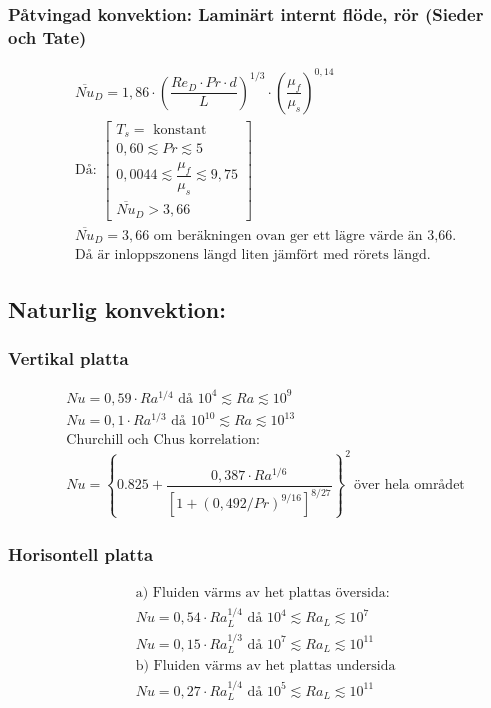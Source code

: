 	\subsubsection*{Påtvingad konvektion: Laminärt internt flöde, rör (Sieder och Tate)}
	\begin{align*}
		&\overline{Nu}_D = 1,86 \cdot \left( \dfrac{Re_D \cdot Pr \cdot d}{L} \right)^{1/3} \cdot \left( \dfrac{\mu_f}{\mu_s} \right)^{0,14} \\[8pt]
		&\text{Då: } 
	\left[
		\begin{array}{l}
			T_s = \text{ konstant} \\
			0,60 \lesssim Pr \lesssim 5\\[3pt]
		0,0044 \lesssim \dfrac{\mu_f}{\mu_s} \lesssim 9,75 \\[8pt]
		\overline{Nu}_D > 3,66
		\end{array}
	\right]
		\\[8pt]
		&\overline{Nu}_D = 3,66 \text{ om beräkningen ovan ger ett lägre värde än 3,66}.\\
		&\text{Då är inloppszonens längd liten jämfört med rörets längd.}
	\end{align*}
	\subsection*{Naturlig konvektion:}
	\subsubsection*{Vertikal platta}
	\begin{align*}
		&Nu = 0,59 \cdot Ra^{1/4} \text{ då } 10^4 \lesssim Ra \lesssim 10^9\\
		&Nu = 0,1 \cdot Ra^{1/3} \text{ då } 10^{10} \lesssim Ra \lesssim 10^{13}\\
		&\text{Churchill och Chus korrelation:} \\
		&Nu = \left\{ 0.825 + \dfrac{0,387 \cdot Ra^{1/6}}{\left[1 + (0,492/Pr)^{9/16}\right]^{8/27}} \right\}^2 \ \text{över hela området} 
	\end{align*}
	\subsubsection*{Horisontell platta}
	\begin{align*}
		&\text{a) Fluiden värms av het plattas översida:} \\
		&Nu = 0,54 \cdot Ra_L^{1/4} \text{ då } 10^4 \lesssim Ra_L \lesssim 10^7 \\
		&Nu = 0,15 \cdot Ra_L^{1/3} \text{ då } 10^7 \lesssim Ra_L \lesssim 10^{11} \\ 
		&\text{b) Fluiden värms av het plattas undersida} \\
		&Nu = 0,27 \cdot Ra_L^{1/4} \text{ då } 10^5 \lesssim Ra_L \lesssim 10^{11}
	\end{align*}
